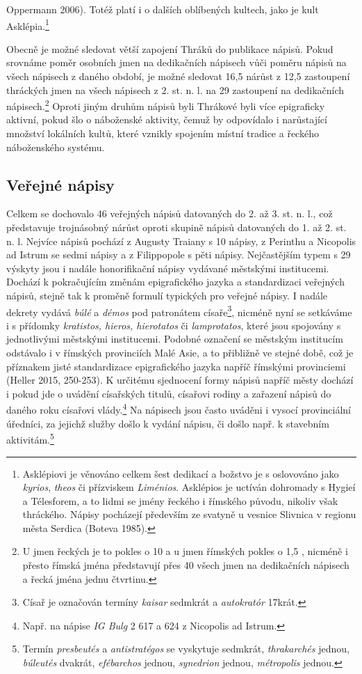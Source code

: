 Oppermann 2006). Totéž platí i o dalších oblíbených kultech, jako je kult Asklépia.\footnote{Asklépiovi je věnováno celkem šest dedikací a božstvo je s oslovováno jako {\em kyrios}, {\em theos} či přízviskem {\em Liménios}. Asklépios je uctíván dohromady s Hygieí a Télesforem, a to lidmi se jmény řeckého i římského původu, nikoliv však thráckého. Nápisy pocházejí především ze svatyně u vesnice Slivnica v regionu města Serdica (Boteva 1985).}

Obecně je možné sledovat větší zapojení Thráků do publikace nápisů. Pokud srovnáme poměr osobních jmen na dedikačních nápisech vůči poměru nápisů na všech nápisech z daného období, je možné sledovat 16,5 nárůst z 12,5 zastoupení thráckých jmen na všech nápisech z 2. st. n. l. na 29  zastoupení na dedikačních nápisech.\footnote{U jmen řeckých je to pokles o 10  a u jmen římských pokles o 1,5 , nicméně i přesto římská jména představují přes 40  všech jmen na dedikačních nápisech a řecká jména jednu čtvrtinu.} Oproti jiným druhům nápisů byli Thrákové byli více epigraficky aktivní, pokud šlo o náboženské aktivity, čemuž by odpovídalo i narůstající množství lokálních kultů, které vznikly spojením místní tradice a řeckého náboženského systému.

\subsection[veřejné-nápisy-14]{Veřejné nápisy}

Celkem se dochovalo 46 veřejných nápisů datovaných do 2. až 3. st. n. l., což představuje trojnásobný nárůst oproti skupině nápisů datovaných do 1. až 2. st. n. l. Nejvíce nápisů pochází z Augusty Traiany s 10 nápisy, z Perinthu a Nicopolis ad Istrum se sedmi nápisy a z Filippopole s pěti nápisy. Nejčastějším typem s 29 výskyty jsou i nadále honorifikační nápisy vydávané městskými institucemi. Dochází k pokračujícím změnám epigrafického jazyka a standardizaci veřejných nápisů, stejně tak k proměně formulí typických pro veřejné nápisy. I nadále dekrety vydává {\em búlé} a {\em démos} pod patronátem císaře\footnote{Císař je označován termíny {\em kaisar} sedmkrát a {\em autokratór} 17krát.}, nicméně nyní se setkáváme i s přídomky {\em kratistos, hieros, hierotatos} či {\em lamprotatos}, které jsou spojovány s jednotlivými městskými institucemi. Podobné označení se městským institucím odstávalo i v římských provinciích Malé Asie, a to přibližně ve stejné době, což je příznakem jisté standardizace epigrafického jazyka napříč římskými provinciemi (Heller 2015, 250-253). K určitému sjednocení formy nápisů napříč městy dochází i pokud jde o uvádění císařských titulů, císařovi rodiny a zařazení nápisů do daného roku císařovi vlády.\footnote{Např. na nápise {\em IG Bulg} 2 617 a 624 z Nicopolis ad Istrum.} Na nápisech jsou často uváděni i vysocí provinciální úředníci, za jejichž služby došlo k vydání nápisu, či došlo např. k stavebním aktivitám.\footnote{Termín {\em presbeutés} a {\em antistratégos} se vyskytuje sedmkrát, {\em thrakarchés} jednou, {\em búleutés} dvakrát, {\em efébarchos} jednou, {\em synedrion} jednou, {\em métropolis} jednou.}

